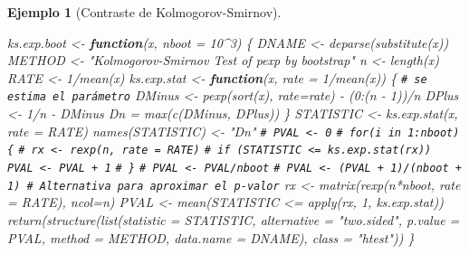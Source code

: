 \documentclass[
]{book}
\newenvironment{Shaded}{\begin{snugshade}}{\end{snugshade}}
\newcommand{\AttributeTok}[1]{\textcolor[rgb]{0.77,0.63,0.00}{#1}}
\newcommand{\CommentTok}[1]{\textcolor[rgb]{0.56,0.35,0.01}{\textit{#1}}}
\newcommand{\ControlFlowTok}[1]{\textcolor[rgb]{0.13,0.29,0.53}{\textbf{#1}}}
\newcommand{\DecValTok}[1]{\textcolor[rgb]{0.00,0.00,0.81}{#1}}
\newcommand{\FunctionTok}[1]{\textcolor[rgb]{0.00,0.00,0.00}{#1}}
\newcommand{\NormalTok}[1]{#1}
\newcommand{\OtherTok}[1]{\textcolor[rgb]{0.56,0.35,0.01}{#1}}
\newcommand{\SpecialCharTok}[1]{\textcolor[rgb]{0.00,0.00,0.00}{#1}}
\newcommand{\StringTok}[1]{\textcolor[rgb]{0.31,0.60,0.02}{#1}}
\theoremstyle{break}
\newtheorem{example}{Ejemplo}[chapter]
\theoremstyle{nonumberplain}
\renewcommand{\CommentTok}[1]{\textcolor[rgb]{0.41,0.41,0.41}{\texttt{#1}}}
\begin{document}
\begin{example}[Contraste de Kolmogorov-Smirnov]
\begin{Shaded}
\begin{Highlighting}[]
\NormalTok{ks.exp.boot }\OtherTok{\textless{}{-}} \ControlFlowTok{function}\NormalTok{(x, }\AttributeTok{nboot =} \DecValTok{10}\SpecialCharTok{\^{}}\DecValTok{3}\NormalTok{) \{}
\NormalTok{  DNAME }\OtherTok{\textless{}{-}} \FunctionTok{deparse}\NormalTok{(}\FunctionTok{substitute}\NormalTok{(x))}
\NormalTok{  METHOD }\OtherTok{\textless{}{-}} \StringTok{"Kolmogorov{-}Smirnov Test of pexp by bootstrap"} 
\NormalTok{  n }\OtherTok{\textless{}{-}} \FunctionTok{length}\NormalTok{(x)}
\NormalTok{  RATE }\OtherTok{\textless{}{-}} \DecValTok{1}\SpecialCharTok{/}\FunctionTok{mean}\NormalTok{(x)}
\NormalTok{  ks.exp.stat }\OtherTok{\textless{}{-}} \ControlFlowTok{function}\NormalTok{(x, }\AttributeTok{rate =} \DecValTok{1}\SpecialCharTok{/}\FunctionTok{mean}\NormalTok{(x)) \{ }\CommentTok{\# se estima el parámetro}
\NormalTok{    DMinus }\OtherTok{\textless{}{-}} \FunctionTok{pexp}\NormalTok{(}\FunctionTok{sort}\NormalTok{(x), }\AttributeTok{rate=}\NormalTok{rate) }\SpecialCharTok{{-}}\NormalTok{ (}\DecValTok{0}\SpecialCharTok{:}\NormalTok{(n }\SpecialCharTok{{-}} \DecValTok{1}\NormalTok{))}\SpecialCharTok{/}\NormalTok{n}
\NormalTok{    DPlus }\OtherTok{\textless{}{-}} \DecValTok{1}\SpecialCharTok{/}\NormalTok{n }\SpecialCharTok{{-}}\NormalTok{ DMinus}
\NormalTok{    Dn }\OtherTok{=} \FunctionTok{max}\NormalTok{(}\FunctionTok{c}\NormalTok{(DMinus, DPlus))}
\NormalTok{  \}  }
\NormalTok{  STATISTIC }\OtherTok{\textless{}{-}} \FunctionTok{ks.exp.stat}\NormalTok{(x, }\AttributeTok{rate =}\NormalTok{ RATE) }
  \FunctionTok{names}\NormalTok{(STATISTIC) }\OtherTok{\textless{}{-}} \StringTok{"Dn"}
  \CommentTok{\# PVAL \textless{}{-} 0}
  \CommentTok{\# for(i in 1:nboot) \{}
  \CommentTok{\#   rx \textless{}{-} rexp(n, rate = RATE)}
  \CommentTok{\#   if (STATISTIC \textless{}= ks.exp.stat(rx)) PVAL \textless{}{-} PVAL + 1}
  \CommentTok{\# \}}
  \CommentTok{\# PVAL \textless{}{-} PVAL/nboot}
  \CommentTok{\# PVAL \textless{}{-} (PVAL + 1)/(nboot + 1) \# Alternativa para aproximar el p{-}valor}
\NormalTok{  rx }\OtherTok{\textless{}{-}} \FunctionTok{matrix}\NormalTok{(}\FunctionTok{rexp}\NormalTok{(n}\SpecialCharTok{*}\NormalTok{nboot, }\AttributeTok{rate =}\NormalTok{ RATE), }\AttributeTok{ncol=}\NormalTok{n)}
\NormalTok{  PVAL }\OtherTok{\textless{}{-}} \FunctionTok{mean}\NormalTok{(STATISTIC }\SpecialCharTok{\textless{}=} \FunctionTok{apply}\NormalTok{(rx, }\DecValTok{1}\NormalTok{, ks.exp.stat))}
  \FunctionTok{return}\NormalTok{(}\FunctionTok{structure}\NormalTok{(}\FunctionTok{list}\NormalTok{(}\AttributeTok{statistic =}\NormalTok{ STATISTIC, }\AttributeTok{alternative =} \StringTok{"two.sided"}\NormalTok{, }
                   \AttributeTok{p.value =}\NormalTok{ PVAL, }\AttributeTok{method =}\NormalTok{ METHOD, }\AttributeTok{data.name =}\NormalTok{ DNAME), }
                   \AttributeTok{class =} \StringTok{"htest"}\NormalTok{))}
\NormalTok{\}}
\end{Highlighting}
\end{Shaded}


\end{example}
\end{document}
